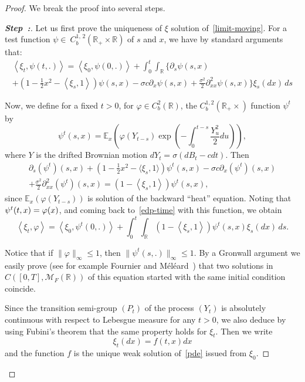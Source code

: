 \documentclass[10pt]{amsart}
\theoremstyle{definition}\newtheorem{defi}[theo]{Definition}\newtheorem{rema}[theo]{Remark}\newtheorem{exam}[theo]{Example}\newtheorem{exem}[theo]{Example}\newtheorem{nota}[theo]{Notation}
\newcommand{\Mo}{\mathcal{M}}
\newcommand*\R{\mathbb{R}}
\newcommand*\E{\mathbb{E}}
\newcounter{stepcount}
\newenvironment{step}{\refstepcounter{stepcount}\begin{proof}[\textbf{Step~\thestepcount:}]}{\let\qed\relax\end{proof}}
\begin{document}
\begin{proof}
We break the proof into several steps.

\begin{step}
Let us first prove the uniqueness of $\xi$ solution of~\eqref{limit-moving}. For a test function $\psi\in~C^{1,\,2}_{b}(\R_{+}\times\R)$ of $s$ and $x$, we have by standard arguments that:
\begin{multline}\label{edp-time}
\left\langle \xi_{t},\psi(t,.)\right\rangle
=\left\langle \xi_{0},\psi(0,.)\right\rangle
+\int_{0}^{t} \int_{\R} \bigg\{ \partial_s \psi(s,x)\\
+ \left(1-\frac{1}{2}x^2-\left\langle \xi_{s}, 1\right\rangle\right)\psi(s,x)
-\sigma c \partial_x \psi(s,x)
 +\frac{\sigma^2}{2}\partial^2_{xx}\psi(s,x)\bigg\} \xi_{s}(dx)\, ds
\end{multline}

Now, we define for a fixed $t>0$, for $\varphi\in C^2_{b}(\R)$, the $C^{1,2}_{b}(\R_+\times)$ function $\psi^t$ by
\[
\psi^t(s,x) = \E_{x}\left(\varphi\left(Y_{t-s}\right)\exp\left(-\int_{0}^{t-s}\frac{Y^2_{u}}{2}du\right)\right),
\]
where $Y$ is the drifted Brownian motion $dY_{t}= \sigma(dB_{t}-cdt)$. Then
\begin{multline}
\partial_s\left(\psi^t\right)(s,x)+ \left(1-\frac{1}{2}x^2-\langle \xi_{s}, 1\rangle\right)\psi^t(s,x)-\sigma c \partial_x\left(\psi^t\right)(s,x)\\+\frac{\sigma^2}{2}\partial^2_{xx}\left(\psi^t\right)(s,x)
= \left(1-\left\langle \xi_{s}, 1\right\rangle\right)\psi^t(s,x),
\end{multline}
since $\E_{x}(\varphi(Y_{t-s}))$ is solution of the backward ``heat'' equation. Noting that $\psi^t(t,x)\linebreak = \varphi(x)$, and coming back to~\eqref{edp-time} with this function, we obtain
\[
\left\langle \xi_{t},\varphi\right\rangle=\left\langle \xi_{0}, \psi^t(0,.)\right\rangle+\int_{0}^{t} \int_{\R} \left(1-\left\langle \xi_{s}, 1\right\rangle\right)\psi^t(s,x) \xi_{s}(dx)\, ds.
\]

Notice that if $\|\varphi\|_\infty \le 1$, then $\|\psi^t(s,.)\|_{\infty}\le 1$. By a Gronwall argument we easily prove (see for example Fournier and Méléard~\cite{fourniermeleard}) that two solutions in $C([0,T],\Mo_{F}(\R))$ of this equation started with the same initial condition coincide.

Since the transition semi-group $(P_{t})$ of the process $(Y_{t})$ is absolutely continuous with respect to Lebesgue measure for any $t>0$, we also deduce by using Fubini's theorem that the same property holds for $\xi_{t}$. Then we write
\[
\xi_{t}(dx) = f(t,x) dx
\]
and the function $f$ is the unique weak solution of~\eqref{pde} issued from $\xi_{0}$.
\end{step}


\end{proof}
\end{document}
